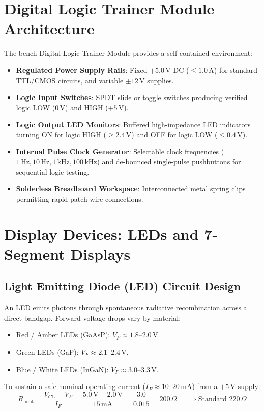 \section{Digital Logic Trainer Module Architecture}
The bench Digital Logic Trainer Module provides a self-contained environment:
\begin{itemize}
    \item \textbf{Regulated Power Supply Rails}: Fixed $+5.0\,\mathrm{V}$ DC ($\le 1.0\,\mathrm{A}$) for standard TTL/CMOS circuits, and variable $\pm 12\,\mathrm{V}$ supplies.
    \item \textbf{Logic Input Switches}: SPDT slide or toggle switches producing verified logic LOW ($0\,\mathrm{V}$) and HIGH ($+5\,\mathrm{V}$).
    \item \textbf{Logic Output LED Monitors}: Buffered high-impedance LED indicators turning ON for logic HIGH ($\ge 2.4\,\mathrm{V}$) and OFF for logic LOW ($\le 0.4\,\mathrm{V}$).
    \item \textbf{Internal Pulse Clock Generator}: Selectable clock frequencies ($1\,\mathrm{Hz}, 10\,\mathrm{Hz}, 1\,\mathrm{kHz}, 100\,\mathrm{kHz}$) and de-bounced single-pulse pushbuttons for sequential logic testing.
    \item \textbf{Solderless Breadboard Workspace}: Interconnected metal spring clips permitting rapid patch-wire connections.
\end{itemize}

\section{Display Devices: LEDs and 7-Segment Displays}
\subsection{Light Emitting Diode (LED) Circuit Design}
An LED emits photons through spontaneous radiative recombination across a direct bandgap. Forward voltage drops vary by material:
\begin{itemize}
    \item Red / Amber LEDs (GaAsP): $V_F \approx 1.8\text{--}2.0\,\mathrm{V}$.
    \item Green LEDs (GaP): $V_F \approx 2.1\text{--}2.4\,\mathrm{V}$.
    \item Blue / White LEDs (InGaN): $V_F \approx 3.0\text{--}3.3\,\mathrm{V}$.
\end{itemize}
To sustain a safe nominal operating current ($I_F \approx 10\text{--}20\,\mathrm{mA}$) from a $+5\,\mathrm{V}$ supply:
\[ R_{\mathrm{limit}} = \frac{V_{CC} - V_F}{I_F} = \frac{5.0\,\mathrm{V} - 2.0\,\mathrm{V}}{15\,\mathrm{mA}} = \frac{3.0}{0.015} = 200\,\Omega \quad \implies \text{Standard } 220\,\Omega \]


